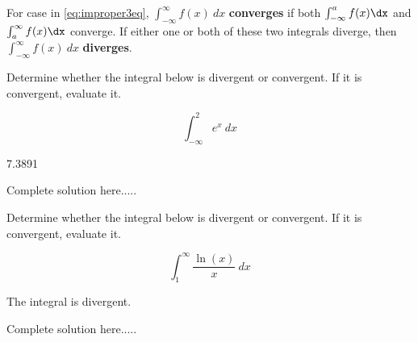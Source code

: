 \noindent For case in \ref{eq:improper3eq}, $\int_{-\infty}^{\infty} f(x) \ dx$ \textbf{converges} if both $\int_{-\infty}^a f(x) \dx$ and $\int_a^{\infty} f(x) \dx$ converge. If either one or both of these two integrals diverge, then $\int_{-\infty}^{\infty} f(x) \ dx$ \textbf{diverges}.

\begin{example}
Determine whether the integral below is divergent or convergent. If it is convergent, evaluate it. 

$$\int_{-\infty}^{2} e^x\ dx$$

    \begin{sol}
    7.3891
    \end{sol}
    \begin{solL}
    Complete solution here.....
    
    \end{solL}
    
\end{example}
\newpage
\begin{example}
Determine whether the integral below is divergent or convergent. If it is convergent, evaluate it. 

$$\int_{1}^{\infty} \frac{\ln(x)}{x}\ dx$$
    \begin{sol}
    The integral is divergent.
    \end{sol}
    \begin{solL}
    Complete solution here.....
    
    \end{solL}
    
\end{example}
